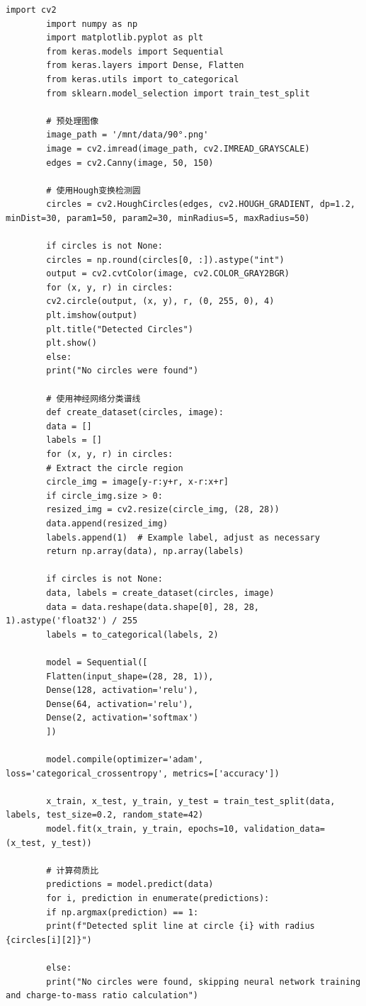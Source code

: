 \documentclass[dvipsnames, svgnames,a4paper,11pt]{article}
\begin{document}
	\begin{lstlisting}[style=pythonstyle,caption=方法实现核心代码]
		import cv2
		import numpy as np
		import matplotlib.pyplot as plt
		from keras.models import Sequential
		from keras.layers import Dense, Flatten
		from keras.utils import to_categorical
		from sklearn.model_selection import train_test_split
		
		# 预处理图像
		image_path = '/mnt/data/90°.png'
		image = cv2.imread(image_path, cv2.IMREAD_GRAYSCALE)
		edges = cv2.Canny(image, 50, 150)
		
		# 使用Hough变换检测圆
		circles = cv2.HoughCircles(edges, cv2.HOUGH_GRADIENT, dp=1.2, minDist=30, param1=50, param2=30, minRadius=5, maxRadius=50)
		
		if circles is not None:
		circles = np.round(circles[0, :]).astype("int")
		output = cv2.cvtColor(image, cv2.COLOR_GRAY2BGR)
		for (x, y, r) in circles:
		cv2.circle(output, (x, y), r, (0, 255, 0), 4)
		plt.imshow(output)
		plt.title("Detected Circles")
		plt.show()
		else:
		print("No circles were found")
		
		# 使用神经网络分类谱线
		def create_dataset(circles, image):
		data = []
		labels = []
		for (x, y, r) in circles:
		# Extract the circle region
		circle_img = image[y-r:y+r, x-r:x+r]
		if circle_img.size > 0:
		resized_img = cv2.resize(circle_img, (28, 28))
		data.append(resized_img)
		labels.append(1)  # Example label, adjust as necessary
		return np.array(data), np.array(labels)
		
		if circles is not None:
		data, labels = create_dataset(circles, image)
		data = data.reshape(data.shape[0], 28, 28, 1).astype('float32') / 255
		labels = to_categorical(labels, 2)
		
		model = Sequential([
		Flatten(input_shape=(28, 28, 1)),
		Dense(128, activation='relu'),
		Dense(64, activation='relu'),
		Dense(2, activation='softmax')
		])
		
		model.compile(optimizer='adam', loss='categorical_crossentropy', metrics=['accuracy'])
		
		x_train, x_test, y_train, y_test = train_test_split(data, labels, test_size=0.2, random_state=42)
		model.fit(x_train, y_train, epochs=10, validation_data=(x_test, y_test))
		
		# 计算荷质比
		predictions = model.predict(data)
		for i, prediction in enumerate(predictions):
		if np.argmax(prediction) == 1:
		print(f"Detected split line at circle {i} with radius {circles[i][2]}")
		
		else:
		print("No circles were found, skipping neural network training and charge-to-mass ratio calculation")
		
	\end{lstlisting}
	
\end{document}
